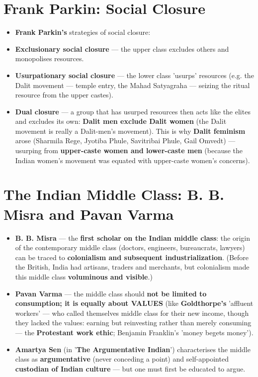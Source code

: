 \section{Frank Parkin: Social Closure}

\begin{KeyConcept}
\begin{itemize}
\item \textbf{Frank Parkin's} strategies of social closure:
\item \textbf{Exclusionary social closure} --- the upper class excludes others and monopolises resources.
\item \textbf{Usurpationary social closure} --- the lower class 'usurps' resources (e.g. the Dalit movement --- temple entry, the Mahad Satyagraha --- seizing the ritual resource from the upper castes).
\item \textbf{Dual closure} --- a group that has usurped resources then acts like the elites and excludes its own: \textbf{Dalit men exclude Dalit women} (the Dalit movement is really a Dalit-men's movement). This is why \textbf{Dalit feminism} arose (Sharmila Rege, Jyotiba Phule, Savitribai Phule, Gail Omvedt) --- usurping from \textbf{upper-caste women and lower-caste men} (because the Indian women's movement was equated with upper-caste women's concerns).
\end{itemize}
\end{KeyConcept}

\section{The Indian Middle Class: B. B. Misra and Pavan Varma}

\begin{KeyConcept}
\begin{itemize}
\item \textbf{B. B. Misra} --- the \textbf{first scholar on the Indian middle class}: the origin of the contemporary middle class (doctors, engineers, bureaucrats, lawyers) can be traced to \textbf{colonialism and subsequent industrialization}. (Before the British, India had artisans, traders and merchants, but colonialism made this middle class \textbf{voluminous and visible}.)
\item \textbf{Pavan Varma} --- the middle class should \textbf{not be limited to consumption; it is equally about VALUES} (like \textbf{Goldthorpe's} 'affluent workers' --- who called themselves middle class for their new income, though they lacked the values: earning but reinvesting rather than merely consuming --- the \textbf{Protestant work ethic}; Benjamin Franklin's 'money begets money').
\item \textbf{Amartya Sen} (in '\textbf{The Argumentative Indian}') characterises the middle class as \textbf{argumentative} (never conceding a point) and self-appointed \textbf{custodian of Indian culture} --- but one must first be educated to argue.
\end{itemize}
\end{KeyConcept}

